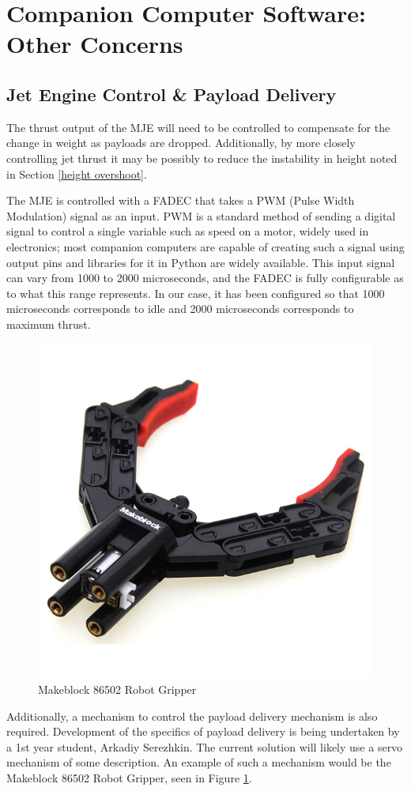 \documentclass[11pt,twoside]{article}
\begin{document}
\section{Companion Computer Software: Other Concerns}
\subsection{Jet Engine Control \& Payload Delivery}
The thrust output of the MJE will need to be controlled to compensate for the change in weight as payloads are dropped. Additionally, by more closely controlling jet thrust it may be possibly to reduce the instability in height noted in Section \ref{height overshoot}.

The MJE is controlled with a FADEC that takes a PWM (Pulse Width Modulation) signal as an input. PWM is a standard method of sending a digital signal to control a single variable such as speed on a motor, widely used in electronics; most companion computers are capable of creating such a signal using output pins and libraries for it in Python are widely available. This input signal can vary from 1000 to 2000 microseconds, and the FADEC is fully configurable as to what this range represents. In our case, it has been configured so that 1000 microseconds corresponds to idle and 2000 microseconds corresponds to maximum thrust.

\begin{figure}
    \begin{center}
        \includegraphics[width=0.48\linewidth]{makeblock_gripper}
        \caption{Makeblock 86502 Robot Gripper}
        \label{fig:makeblock_gripper}
    \end{center}
\end{figure}

Additionally, a mechanism to control the payload delivery mechanism is also required. Development of the specifics of payload delivery is being undertaken by a 1st year student, Arkadiy Serezhkin. The current solution will likely use a servo mechanism of some description. An example of such a mechanism would be the Makeblock 86502 Robot Gripper\cite{Makeblock_gripper}, seen in Figure \ref{fig:makeblock_gripper}.
\end{document}
